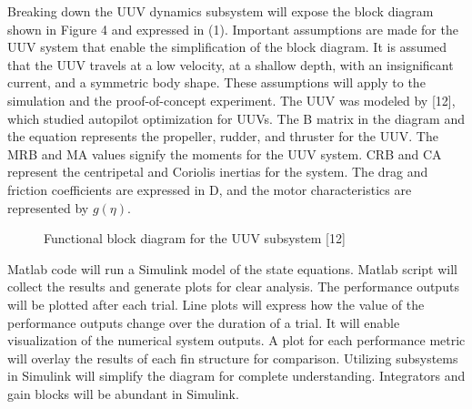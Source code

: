 \documentclass{IEEEtran}
\begin{document}
Breaking down the UUV dynamics subsystem will expose the block diagram shown in Figure 4 and expressed in (1).  Important assumptions are made for the UUV system that enable the simplification of the block diagram.  It is assumed that the UUV travels at a low velocity, at a shallow depth, with an insignificant current, and a symmetric body shape.  These assumptions will apply to the simulation and the proof-of-concept experiment.  The UUV was modeled by [12], which studied autopilot optimization for UUVs.  The B matrix in the diagram and the equation represents the propeller, rudder, and thruster for the UUV.  The MRB and MA values signify the moments for the UUV system.  CRB and CA represent the centripetal and Coriolis inertias for the system.  The drag and friction coefficients are expressed in D, and the motor characteristics are represented by $g(\eta)$.  
\begin{figure}
\caption{Functional block diagram for the UUV subsystem [12]}
\label{fig:4}
\end{figure}

Matlab code will run a Simulink model of the state equations.  Matlab script will collect the results and generate plots for clear analysis.  The performance outputs will be plotted after each trial.  Line plots will express how the value of the performance outputs change over the duration of a trial.  It will enable visualization of the numerical system outputs.  A plot for each performance metric will overlay the results of each fin structure for comparison.  Utilizing subsystems in Simulink will simplify the diagram for complete understanding.  Integrators and gain blocks will be abundant in Simulink.
\end{document}
